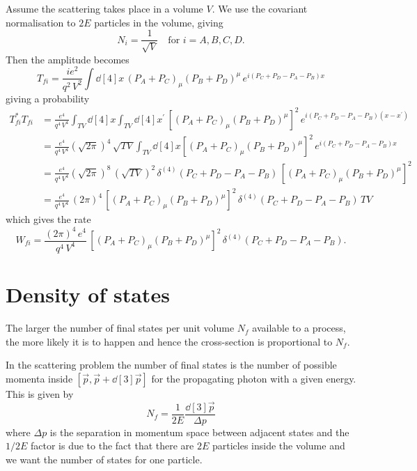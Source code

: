 Assume the scattering takes place in a volume $V$. We use the covariant normalisation to $2E$ particles in the volume, giving
\begin{equation}
N_i = \frac{1}{\sqrt{V}} \quad \text{for $i=A,B,C,D$.}
\end{equation}
Then the amplitude becomes
\begin{equation}
T_{fi} = \frac{ie^2}{q^2 \, V^2} \int \dd[4]{x} \, (P_A + P_C)_\mu (P_B + P_D)^\mu \, e^{i(P_C+P_D-P_A-P_B)x}
\end{equation}
giving a probability
\begin{align}
T_{fi}^* T_{fi} &= \frac{e^4}{q^4 \, V^4} \int_{TV} \dd[4]x \int_{TV} \dd[4]x^\prime \, \left[ (P_A + P_C)_\mu (P_B + P_D)^\mu \right]^2 \, e^{i(P_C+P_D-P_A-P_B)(x-x^\prime)} \\
&= \frac{e^4}{q^4 \, V^4} \left(\sqrt{2\pi}\right)^4 \, \sqrt{TV} \int_{TV} \dd[4]{x} \left[ (P_A + P_C)_\mu (P_B + P_D)^\mu \right]^2 \, e^{i(P_C+P_D-P_A-P_B)x} \nonumber \\
&= \frac{e^4}{q^4 \, V^4} \left(\sqrt{2\pi}\right)^8 \, \left(\sqrt{TV}\right)^2 \, \delta^{(4)}(P_C+P_D-P_A-P_B) \,  \left[ (P_A + P_C)_\mu (P_B + P_D)^\mu \right]^2 \nonumber \\
&= \frac{e^4}{q^4 \, V^4} \, (2\pi)^4 \, \left[ (P_A + P_C)_\mu (P_B + P_D)^\mu \right]^2\, \delta^{(4)}(P_C+P_D-P_A-P_B)\, TV
\end{align}
which gives the rate
\begin{equation}
W_{fi} = \frac{(2\pi)^4\,e^4}{q^4 \, V^4} \, \left[ (P_A + P_C)_\mu (P_B + P_D)^\mu \right]^2\, \delta^{(4)}(P_C+P_D-P_A-P_B).
\end{equation}

\section{Density of states}
The larger the number of final states per unit volume $N_f$ available to a process, the more likely it is to happen and hence the cross-section is proportional to $N_f$.

In the scattering problem the number of final states is the number of possible momenta inside $[\vec{p}, \vec{p}+\dd[3]{\vec{p}}]$ for the propagating photon with a given energy. This is given by
\begin{equation}
N_f = \frac{1}{2E} \frac{\dd[3]{\vec{p}}}{\Delta p}
\end{equation}
where $\Delta p$ is the separation in momentum space between adjacent states and the $1/2E$ factor is due to the fact that there are $2E$ particles inside the volume and we want the number of states for one particle.

